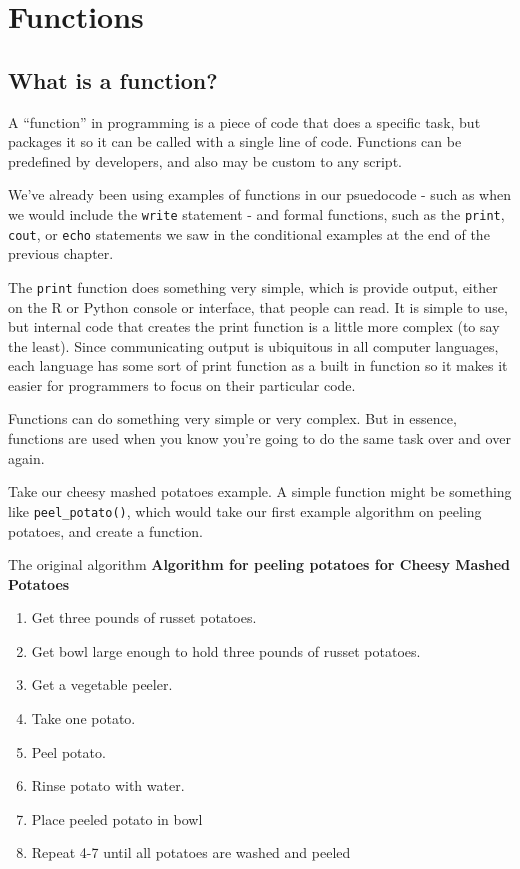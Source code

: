 \documentclass[
]{book}
\providecommand{\tightlist}{%
  \setlength{\itemsep}{0pt}\setlength{\parskip}{0pt}}
\begin{document}
\chapter{Functions}\label{functions}

\section{What is a function?}\label{what-is-a-function}

A ``function'' in programming is a piece of code that does a specific task, but packages it so it can be called with a single line of code. Functions can be predefined by developers, and also may be custom to any script.

We've already been using examples of functions in our psuedocode - such as when we would include the \texttt{write} statement - and formal functions, such as the \texttt{print}, \texttt{cout}, or \texttt{echo} statements we saw in the conditional examples at the end of the previous chapter.

The \texttt{print} function does something very simple, which is provide output, either on the R or Python console or interface, that people can read. It is simple to use, but internal code that creates the print function is a little more complex (to say the least). Since communicating output is ubiquitous in all computer languages, each language has some sort of print function as a built in function so it makes it easier for programmers to focus on their particular code.

Functions can do something very simple or very complex. But in essence, functions are used when you know you're going to do the same task over and over again.

Take our cheesy mashed potatoes example. A simple function might be something like \texttt{peel\_potato()}, which would take our first example algorithm on peeling potatoes, and create a function.

The original algorithm
\textbf{Algorithm for peeling potatoes for Cheesy Mashed Potatoes}

\begin{enumerate}
\def\labelenumi{\arabic{enumi}.}
\tightlist
\item
  Get three pounds of russet potatoes.
\item
  Get bowl large enough to hold three pounds of russet potatoes.
\item
  Get a vegetable peeler.
\item
  Take one potato.
\item
  Peel potato.
\item
  Rinse potato with water.
\item
  Place peeled potato in bowl
\item
  Repeat 4-7 until all potatoes are washed and peeled
\end{enumerate}
\end{document}
